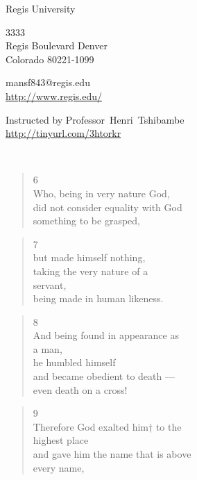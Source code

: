 \documentclass[11pt,a4paper]{scrartcl} %
\begin{document}
\pagecolor{Sepia!04}
\begin{cv}{}
        \begin{cvlist}{\textcolor{brown}{}}\label{PersDat}  
            \item   Regis University
            \item   3333\\
                    Regis Boulevard Denver \\	
                    Colorado 80221-1099
            \item   mansf843@regis.edu\\				
                    \url{http://www.regis.edu/}				
        \end{cvlist}
        \begin{cvlist}{}\label{irgendwas}
            \item Instructed by Professor~Henri~Tshibambe\\
             \url{http://tinyurl.com/3htorkr}
        \end{cvlist}
    \end{cv}
\clearpage
\noindent
\textcolor{Maroon}{}\\
\textcolor{brown}{}
\begin{verse}
6\\ Who, being in very nature God, \\ did not consider equality with God \\ something to be grasped, 
\end{verse}
\begin{verse}
7\\ but made himself nothing,\\ taking the very nature of a\\ servant, \\ being made in human likeness.
\end{verse}
\begin{verse}
8\\ And being found in appearance as\\ a man,\\he humbled himself\\ and became obedient to death —\\ even death on a cross!
\end{verse}
\begin{verse}
9\\ Therefore God exalted him† to the\\ highest place\\ and gave him the name that is above\\ every name,
\end{verse}
\end{document}
